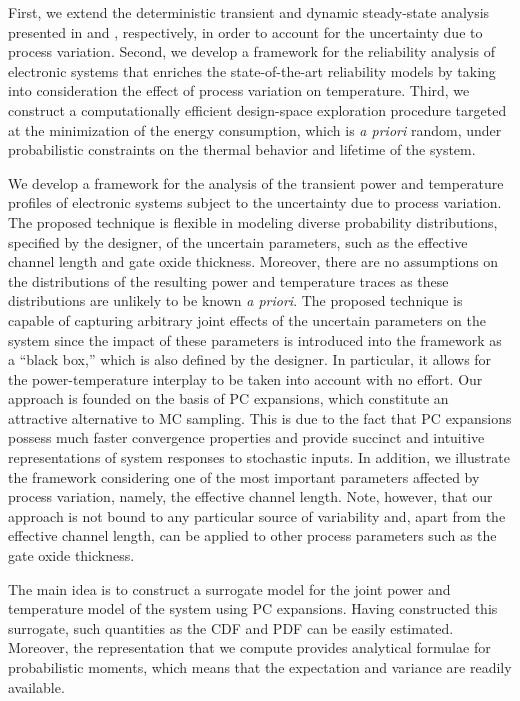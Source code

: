 First, we extend the deterministic transient and dynamic steady-state analysis
presented in  and ,
respectively, in order to account for the uncertainty due to process variation.
Second, we develop a framework for the reliability analysis of electronic
systems that enriches the state-of-the-art reliability models by taking into
consideration the effect of process variation on temperature. Third, we
construct a computationally efficient design-space exploration procedure
targeted at the minimization of the energy consumption, which is \emph{a priori}
random, under probabilistic constraints on the thermal behavior and lifetime of
the system.

We develop a framework for the analysis of the transient power and temperature
profiles of electronic systems subject to the uncertainty due to process
variation. The proposed technique is flexible in modeling diverse probability
distributions, specified by the designer, of the uncertain parameters, such as
the effective channel length and gate oxide thickness. Moreover, there are no
assumptions on the distributions of the resulting power and temperature traces
as these distributions are unlikely to be known \emph{a priori}. The proposed
technique is capable of capturing arbitrary joint effects of the uncertain
parameters on the system since the impact of these parameters is introduced into
the framework as a ``black box,'' which is also defined by the designer. In
particular, it allows for the power-temperature interplay to be taken into
account with no effort. Our approach is founded on the basis of \acf{PC}
expansions, which constitute an attractive alternative to \ac{MC} sampling. This
is due to the fact that \ac{PC} expansions possess much faster convergence
properties and provide succinct and intuitive representations of system
responses to stochastic inputs. In addition, we illustrate the framework
considering one of the most important parameters affected by process variation,
namely, the effective channel length. Note, however, that our approach is not
bound to any particular source of variability and, apart from the effective
channel length, can be applied to other process parameters such as the gate
oxide thickness.

The main idea is to construct a surrogate model for the joint power and
temperature model of the system using \ac{PC} expansions. Having constructed
this surrogate, such quantities as the \acf{CDF} and \acf{PDF} can be easily
estimated. Moreover, the representation that we compute provides analytical
formulae for probabilistic moments, which means that the expectation and
variance are readily available.


